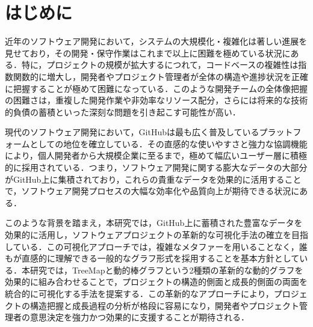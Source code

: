 \documentclass[12pt,twoside]{jbook}
\begin{document}
\begin{acknowledgments}


\end{acknowledgments}


\tableofcontents       %

%
%

\listoffigures         %
\listoftables          %


%
%
\chapter{はじめに}
近年のソフトウェア開発において，システムの大規模化・複雑化は著しい進展を見せており，その開発・保守作業はこれまで以上に困難を極めている状況にある．特に，プロジェクトの規模が拡大するにつれて，コードベースの複雑性は指数関数的に増大し，開発者やプロジェクト管理者が全体の構造や進捗状況を正確に把握することが極めて困難になっている．このような開発チームの全体像把握の困難さは，重複した開発作業や非効率なリソース配分，さらには将来的な技術的負債の蓄積といった深刻な問題を引き起こす可能性が高い．

現代のソフトウェア開発において，GitHubは最も広く普及しているプラットフォームとしての地位を確立している．その直感的な使いやすさと強力な協調機能により，個人開発者から大規模企業に至るまで，極めて幅広いユーザー層に積極的に採用されている．つまり，ソフトウェア開発に関する膨大なデータの大部分がGitHub上に集積されており，これらの貴重なデータを効果的に活用することで，ソフトウェア開発プロセスの大幅な効率化や品質向上が期待できる状況にある．

このような背景を踏まえ，本研究では，GitHub上に蓄積された豊富なデータを効果的に活用し，ソフトウェアプロジェクトの革新的な可視化手法の確立を目指している．この可視化アプローチでは，複雑なメタファーを用いることなく，誰もが直感的に理解できる一般的なグラフ形式を採用することを基本方針としている．本研究では，TreeMapと動的棒グラフという2種類の革新的な動的グラフを効果的に組み合わせることで，プロジェクトの構造的側面と成長的側面の両面を統合的に可視化する手法を提案する．この革新的なアプローチにより，プロジェクトの構造把握と成長過程の分析が格段に容易になり，開発者やプロジェクト管理者の意思決定を強力かつ効果的に支援することが期待される．
\end{document}
